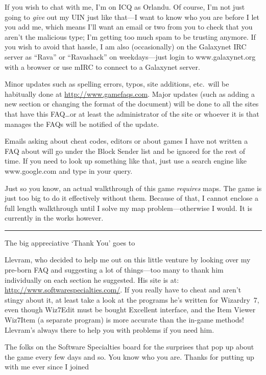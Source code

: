\documentclass[10pt,twoside,openright]{report}
\begin{document}
If you wish to chat with me, I'm on ICQ as Orlandu. Of course, I'm not
just going to \emph{give} out my UIN just like that---I want to know who
you are before I let you add me, which means I'll want an email or two
from you to check that you aren't the malicious type; I'm getting too
much spam to be trusting anymore. If you wish to avoid that hassle, I am
also (occasionally) on the Galaxynet IRC server as ``Rava'' or
``Ravashack'' on weekdays---just login to www.galaxynet.org with a
browser or use mIRC to connect to a Galaxynet server.

Minor updates such as spelling errors, typos, site additions, etc.\ will
be habitually done at \url{http://www.gamefaqs.com}. Major updates (such
as adding a new section or changing the format of the document) will be
done to all the sites that have this FAQ\ldots{}or at least the
administrator of the site or whoever it is that manages the FAQs will be
notified of the update.

Emails asking about cheat codes, editors or about games I have not
written a FAQ about will go under the Block Sender list and be ignored
for the rest of time. If you need to look up something like that, just
use a search engine like www.google.com and type in your query.

Just so you know, an actual walkthrough of this game \emph{requires}
maps. The game is just too big to do it effectively without them.
Because of that, I cannot enclose a full length walkthrough until I
solve my map problem---otherwise I would. It is currently in the works
however.

\begin{center}\rule{0.5\linewidth}{\linethickness}\end{center}

The big appreciative `Thank You' goes to

Llevram, who decided to help me out on this little venture by looking over my
pre-born FAQ and suggesting a lot of things---too many to thank him
individually on each section he suggested. His site is at:
\url{http://www.softwarespecialties.com/}. If you really have to cheat and
aren't stingy about it, at least take a look at the programs he's written for
Wizardry~7, even though Wiz7Edit must be bought Excellent interface, and the
Item Viewer Wiz7Item (a separate program) is more accurate than the in-game
methods! Llevram's always there to help you with problems if you need him.

The folks on the Software Specialties board for the surprises that pop
up about the game every few days and so. You know who you are. Thanks
for putting up with me ever since I joined
\end{document}
